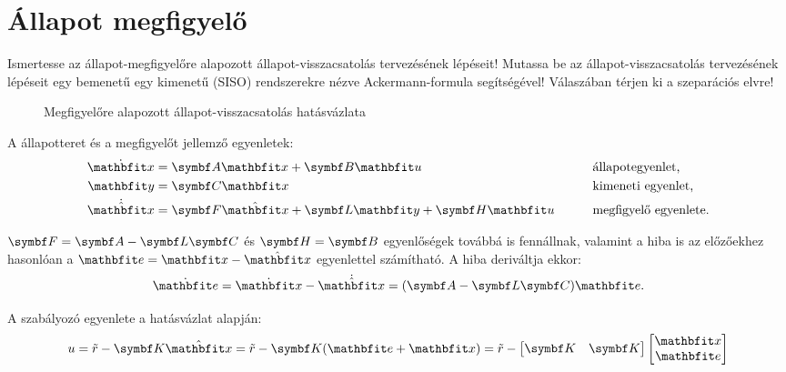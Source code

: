 \section{Állapot megfigyelő}

\begin{about}
  Ismertesse az állapot-megfigyelőre alapozott állapot-visszacsatolás
  tervezésének lépéseit! Mutassa be az állapot-visszacsatolás tervezésének
  lépéseit egy bemenetű egy kimenetű (SISO) rendszerekre nézve Ackermann-formula
  segítségével! Válaszában térjen ki a szeparációs elvre!
\end{about}

\begin{figure}[htb]
  \centering
  
  \caption{Megfigyelőre alapozott állapot-visszacsatolás hatásvázlata}
  \label{fig:observer-K}
\end{figure}

A állapotteret és a megfigyelőt jellemző egyenletek:
\begin{alignat}{9}
  \dot{\rvec x} & = \rmat A \rvec x + \rmat B \rvec u
                &
                & \text{állapotegyenlet,}
  \\
  \rvec y       & = \rmat C \rvec x
                &
                & \text{kimeneti egyenlet,}
  \\
  \dot{\hvec x} & = \rmat F \hvec x + \rmat L \rvec y + \rmat H \rvec u \quad \quad
                &
                & \text{megfigyelő egyenlete.}
\end{alignat}

$\rmat F = \rmat A - \rmat L \rmat C$ és $\rmat H = \rmat B$ egyenlőségek
továbbá is fennállnak, valamint a hiba is az előzőekhez hasonlóan a $\rvec e =
  \rvec x - \hvec x$ egyenlettel számítható. A hiba deriváltja ekkor:
\begin{equation}
  \dot{\rvec e}
  = \dot{\rvec x} - \dot{\hvec x}
  = (\rmat A - \rmat L \rmat C) \rvec e.
\end{equation}

A szabályozó egyenlete a hatásvázlat alapján:
\begin{equation}
  u
  = \tilde r - \rmat K \hvec x
  = \tilde r - \rmat K (\rvec e + \rvec x)
  = \tilde r - \begin{bmatrix}
    \rmat K & \rmat K
  \end{bmatrix} \begin{bmatrix}
    \rvec x \\ \rvec e
  \end{bmatrix}
\end{equation}

